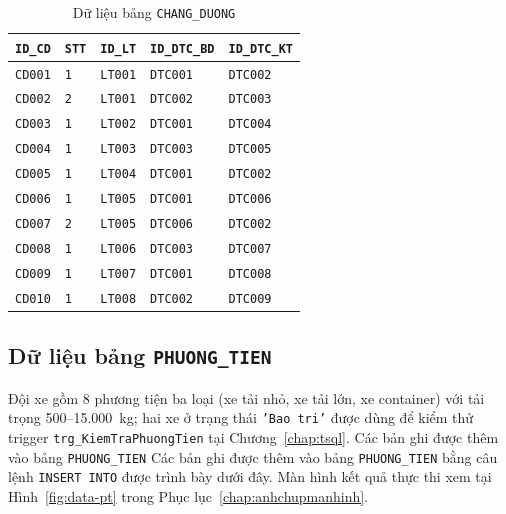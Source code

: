\documentclass[11pt]{report}
\begin{document}
\begin{table}[H]
    \centering
    \renewcommand{\tabularxcolumn}[1]{m{#1}}
    \begin{tabularx}{\textwidth}{|l|l|l|l|>{\raggedright\arraybackslash}X|} \hline
        \rowcolor{teal!30}
        \textbf{\texttt{ID\_CD}} & \textbf{\texttt{STT}} & \textbf{\texttt{ID\_LT}} & \textbf{\texttt{ID\_DTC\_BD}} & \textbf{\texttt{ID\_DTC\_KT}} \\ \hline
        \texttt{CD001} & \texttt{1} & \texttt{LT001} & \texttt{DTC001} & \texttt{DTC002} \\ \hline
        \texttt{CD002} & \texttt{2} & \texttt{LT001} & \texttt{DTC002} & \texttt{DTC003} \\ \hline
        \texttt{CD003} & \texttt{1} & \texttt{LT002} & \texttt{DTC001} & \texttt{DTC004} \\ \hline
        \texttt{CD004} & \texttt{1} & \texttt{LT003} & \texttt{DTC003} & \texttt{DTC005} \\ \hline
        \texttt{CD005} & \texttt{1} & \texttt{LT004} & \texttt{DTC001} & \texttt{DTC002} \\ \hline
        \texttt{CD006} & \texttt{1} & \texttt{LT005} & \texttt{DTC001} & \texttt{DTC006} \\ \hline
        \texttt{CD007} & \texttt{2} & \texttt{LT005} & \texttt{DTC006} & \texttt{DTC002} \\ \hline
        \texttt{CD008} & \texttt{1} & \texttt{LT006} & \texttt{DTC003} & \texttt{DTC007} \\ \hline
        \texttt{CD009} & \texttt{1} & \texttt{LT007} & \texttt{DTC001} & \texttt{DTC008} \\ \hline
        \texttt{CD010} & \texttt{1} & \texttt{LT008} & \texttt{DTC002} & \texttt{DTC009} \\ \hline
    \end{tabularx}
    \caption{Dữ liệu bảng \texttt{CHANG\_DUONG}}
    \label{tab:data_cd}
\end{table}


\subsection{Dữ liệu bảng \texttt{PHUONG\_TIEN}}

Đội xe gồm 8 phương tiện ba loại (xe tải nhỏ, xe tải lớn, xe container) với tải trọng 500--15.000~kg; hai xe ở trạng thái \texttt{'Bao tri'} được dùng để kiểm thử trigger \texttt{trg\_KiemTraPhuongTien} tại Chương~\ref{chap:tsql}. Các bản ghi được thêm vào bảng \texttt{PHUONG\_TIEN} Các bản ghi được thêm vào bảng \texttt{PHUONG\_TIEN} bằng câu lệnh \texttt{INSERT INTO} được trình bày dưới đây. Màn hình kết quả thực thi xem tại Hình~\ref{fig:data-pt} trong Phục lục~\ref{chap:anhchupmanhinh}.
\end{document}
